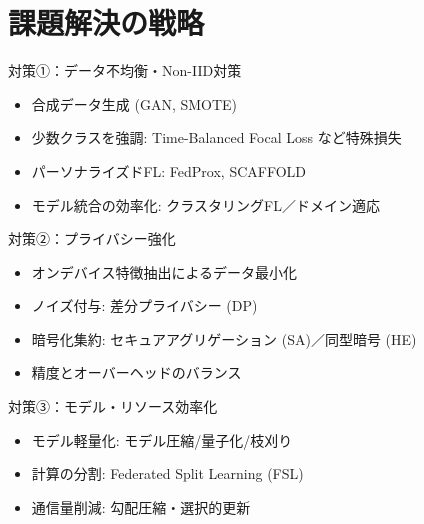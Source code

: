 \documentclass[unicode,12pt,aspectratio=169,dvipdfmx]{beamer}
\begin{document}
\section{課題解決の戦略}
\begin{frame}{対策①：データ不均衡・Non-IID対策}
  \begin{itemize}
    \item 合成データ生成 (GAN, SMOTE)
    \item 少数クラスを強調: Time-Balanced Focal Loss など特殊損失
    \item パーソナライズドFL: FedProx, SCAFFOLD
    \item モデル統合の効率化: クラスタリングFL／ドメイン適応
  \end{itemize}
\end{frame}
\begin{frame}{対策②：プライバシー強化}
  \begin{itemize}
    \item オンデバイス特徴抽出によるデータ最小化
    \item ノイズ付与: 差分プライバシー (DP)
    \item 暗号化集約: セキュアアグリゲーション (SA)／同型暗号 (HE)
    \item 精度とオーバーヘッドのバランス
  \end{itemize}
\end{frame}
\begin{frame}{対策③：モデル・リソース効率化}
  \begin{itemize}
    \item モデル軽量化: モデル圧縮/量子化/枝刈り
    \item 計算の分割: Federated Split Learning (FSL)
    \item 通信量削減: 勾配圧縮・選択的更新
  \end{itemize}
\end{frame}
\end{document}

